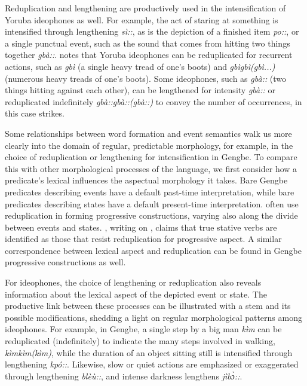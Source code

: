 \documentclass[output=paper,colorlinks,citecolor=brown]{langscibook}
\begin{document}
Reduplication  and lengthening are productively used in the intensification of Yoruba ideophones as well. For example, the act of staring at something is intensified through lengthening \textit{sì::}, as is the depiction of a finished item \textit{po::}, or a single punctual event, such as the sound that comes from hitting two things together \textit{gbà::}. \citet{Awoyale1978} notes that Yoruba ideophones can be reduplicated for recurrent actions, such as \textit{gbì} (a single heavy tread of one's boots) and \textit{gbìgbì(gbì...)} (numerous heavy treads of one's boots). Some ideophones, such as \textit{gbà::} (two things hitting against each other), can be lengthened for intensity \textit{gbà::} or reduplicated indefinitely \textit{gbà::gbà::(gbà::)} to convey the number of occurrences, in this case strikes.

\begin{sloppypar}
Some relationships between word formation and event semantics walk us more clearly into the domain of regular, predictable morphology, for example, in the choice of reduplication or lengthening for intensification in Gengbe. To compare this with other morphological processes of the language, we first consider how a predicate’s lexical  influences the aspectual morphology it takes. Bare Gengbe predicates describing events have a default past-time interpretation, while bare predicates describing states have a default present-time interpretation.  often use reduplication in forming progressive constructions, varying also along the divide between events and states. \citet{Essegbey1999}, writing on , claims that true stative verbs are identified as those that resist reduplication for progressive aspect. A similar correspondence between lexical aspect and reduplication can be found in Gengbe progressive constructions as well. 
\end{sloppypar}

For ideophones, the choice of lengthening or reduplication also reveals information about the lexical aspect of the depicted event or state. The productive link between these processes can be illustrated with a stem and its possible modifications, shedding a light on regular morphological patterns among ideophones. For example, in Gengbe, a single step by a big man \textit{kìm} can be reduplicated (indefinitely) to indicate the  many steps involved in walking, \textit{kìmkìm(kìm)}, while the duration of an object sitting still is intensified through lengthening \textit{kpó::}. Likewise, slow or quiet actions are emphasized or exaggerated  through lengthening \textit{blèù::}, and intense darkness lengthens \textit{jìbɔ̀::}. 
\end{document}
